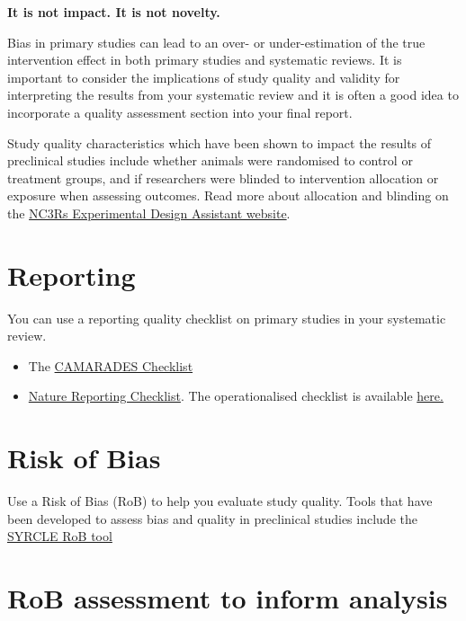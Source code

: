 \documentclass[
]{book}
\begin{document}
\textbf{It is not impact. It is not novelty.}

Bias in primary studies can lead to an over- or under-estimation of the true intervention effect in both primary studies and systematic reviews. It is important to consider the implications of study quality and validity for interpreting the results from your systematic review and it is often a good idea to incorporate a quality assessment section into your final report.

Study quality characteristics which have been shown to impact the results of preclinical studies include whether animals were randomised to control or treatment groups, and if researchers were blinded to intervention allocation or exposure when assessing outcomes.
Read more about allocation and blinding on the \href{https://eda.nc3rs.org.uk/experimental-design-allocation}{NC3Rs Experimental Design Assistant website}.

\hypertarget{reporting}{%
\section{Reporting}\label{reporting}}

You can use a reporting quality checklist on primary studies in your systematic review.

\begin{itemize}
\item
  The \href{https://www.ahajournals.org/doi/pdf/10.1161/01.str.0000125719.25853.20}{CAMARADES Checklist}
\item
  \href{https://www.gene-quantification.de/checklist-for-life-sciences-articles.pdf}{Nature Reporting Checklist}. The operationalised checklist is available \href{https://link.springer.com/article/10.1007/s11192-016-1964-8/tables/6}{here.}
\end{itemize}

\hypertarget{risk-of-bias}{%
\section{Risk of Bias}\label{risk-of-bias}}

Use a Risk of Bias (RoB) to help you evaluate study quality. Tools that have been developed to assess bias and quality in preclinical studies include the \href{https://bmcmedresmethodol.biomedcentral.com/track/pdf/10.1186/1471-2288-14-43}{SYRCLE RoB tool}

\hypertarget{rob-assessment-to-inform-analysis}{%
\section{RoB assessment to inform analysis}\label{rob-assessment-to-inform-analysis}}
\end{document}
